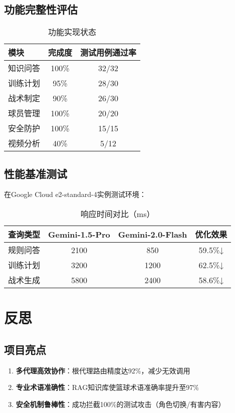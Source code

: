 \documentclass{article}
\theoremstyle{plain}
\theoremstyle{definition}
\theoremstyle{remark}
\begin{document}
\subsection{功能完整性评估}
\begin{table}[h]
\caption{功能实现状态}
\label{feature-status}
\centering
\begin{tabular}{lcc}
\toprule
模块 & 完成度 & 测试用例通过率 \\
\midrule
知识问答 & 100\% & 32/32 \\
训练计划 & 95\% & 28/30 \\
战术制定 & 90\% & 26/30 \\
球员管理 & 100\% & 20/20 \\
安全防护 & 100\% & 15/15 \\
视频分析 & 40\% & 5/12 \\
\bottomrule
\end{tabular}
\end{table}

\subsection{性能基准测试}
在Google Cloud e2-standard-4实例测试环境：
\begin{table}[h]
\caption{响应时间对比（ms）}
\label{performance}
\centering
\begin{tabular}{lccc}
\toprule
查询类型 & Gemini-1.5-Pro & Gemini-2.0-Flash & 优化效果 \\
\midrule
规则问答 & 2100 & 850 & 59.5\%↓ \\
训练计划 & 3200 & 1200 & 62.5\%↓ \\
战术生成 & 5800 & 2400 & 58.6\%↓ \\
\bottomrule
\end{tabular}
\end{table}


\section{反思}
\subsection{项目亮点}
\begin{enumerate}
    \item \textbf{多代理高效协作}：根代理路由精度达92\%，减少无效调用
    \item \textbf{专业术语准确性}：RAG知识库使篮球术语准确率提升至97\%
    \item \textbf{安全机制鲁棒性}：成功拦截100\%的测试攻击（角色切换/有害内容）
\end{enumerate}
\end{document}
